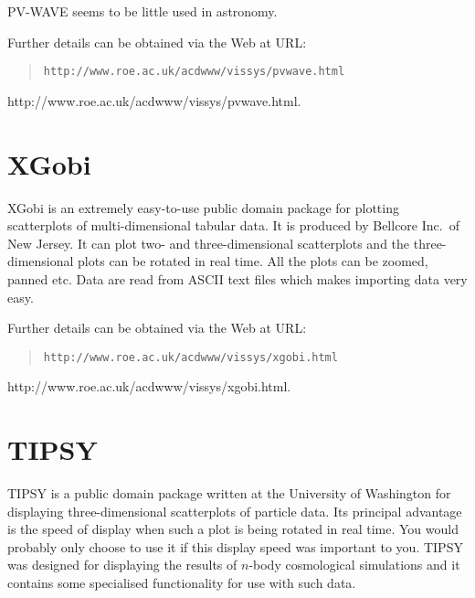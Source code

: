 PV-WAVE seems to be little used in astronomy.
\begin{latexonly}
Further details can be obtained via the Web at URL:

\begin{quote}
{\tt http://www.roe.ac.uk/acdwww/vissys/pvwave.html}
\end{quote}
\end{latexonly}

\begin{htmlonly}

{http://www.roe.ac.uk/acdwww/vissys/pvwave.html}.
\end{htmlonly}


\section{XGobi \label{XGOBI}  }

XGobi is an extremely easy-to-use public domain package for plotting
scatterplots of multi-dimensional tabular data. It is produced by
Bellcore Inc.\ of New Jersey. It can plot two- and three-dimensional
scatterplots and the three-dimensional plots can be rotated in real time.
All the plots can be zoomed, panned etc. Data are read from ASCII text
files which makes importing data very easy.

\begin{latexonly}
Further details can be obtained via the Web at URL:

\begin{quote}
{\tt http://www.roe.ac.uk/acdwww/vissys/xgobi.html}
\end{quote}
\end{latexonly}

\begin{htmlonly}
{http://www.roe.ac.uk/acdwww/vissys/xgobi.html}.
\end{htmlonly}


\section{TIPSY \label{TIPSY}  }

TIPSY is a public domain package written at the University of
Washington for displaying three-dimensional scatterplots of particle
data. Its principal advantage is the speed of display when such a
plot is being rotated in real time. You would probably only choose to
use it if this display speed was important to you. TIPSY was designed
for displaying the results of $n$-body cosmological simulations and it
contains some specialised functionality for use with such data.

